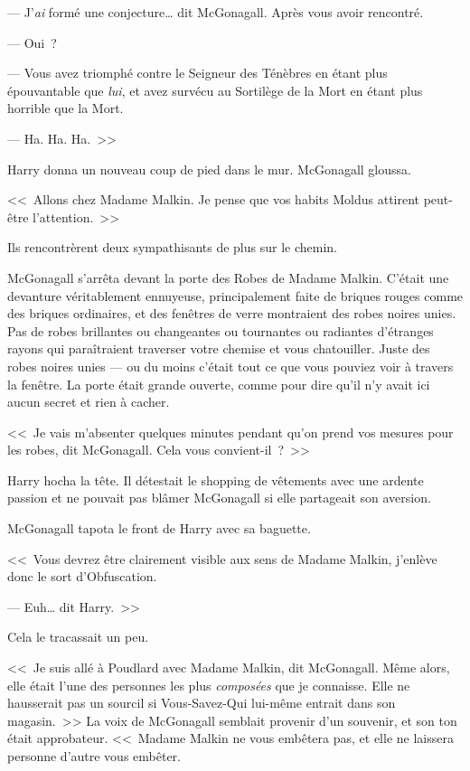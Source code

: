 --- J'\emph{ai} formé une conjecture… dit McGonagall. Après vous avoir rencontré.

--- Oui~?

--- Vous avez triomphé contre le Seigneur des Ténèbres en étant plus épouvantable que \emph{lui}, et avez survécu au Sortilège de la Mort en étant plus horrible que la Mort.

--- Ha. Ha. Ha.~>>

Harry donna un nouveau coup de pied dans le mur. McGonagall gloussa.

<<~Allons chez Madame Malkin. Je pense que vos habits Moldus attirent peut-être l'attention.~>>

Ils rencontrèrent deux sympathisants de plus sur le chemin.

McGonagall s'arrêta devant la porte des Robes de Madame Malkin. C'était une devanture véritablement ennuyeuse, principalement faite de briques rouges comme des briques ordinaires, et des fenêtres de verre montraient des robes noires unies. Pas de robes brillantes ou changeantes ou tournantes ou radiantes d'étranges rayons qui paraîtraient traverser votre chemise et vous chatouiller. Juste des robes noires unies — ou du moins c'était tout ce que vous pouviez voir à travers la fenêtre. La porte était grande ouverte, comme pour dire qu'il n'y avait ici aucun secret et rien à cacher.

<<~Je vais m'absenter quelques minutes pendant qu'on prend vos mesures pour les robes, dit McGonagall. Cela vous convient-il~?~>>

Harry hocha la tête. Il détestait le shopping de vêtements avec une ardente passion et ne pouvait pas blâmer McGonagall si elle partageait son aversion.

McGonagall tapota le front de Harry avec sa baguette.

<<~Vous devrez être clairement visible aux sens de Madame Malkin, j'enlève donc le sort d'Obfuscation.

--- Euh… dit Harry.~>>

Cela le tracassait un peu.

<<~Je suis allé à Poudlard avec Madame Malkin, dit McGonagall. Même alors, elle était l'une des personnes les plus \emph{composées} que je connaisse. Elle ne hausserait pas un sourcil si Vous-Savez-Qui lui-même entrait dans son magasin.~>> La voix de McGonagall semblait provenir d'un souvenir, et son ton était approbateur. <<~Madame Malkin ne vous embêtera pas, et elle ne laissera personne d'autre vous embêter.

